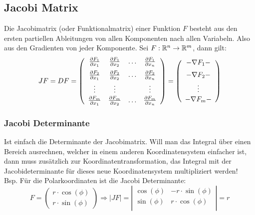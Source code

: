 \subsection{Jacobi Matrix}
Die Jacobimatrix (oder Funktionalmatrix) einer Funktion $F$ besteht aus den ersten partiellen Ableitungen von allen Komponenten nach allen Variabeln. Also aus den Gradienten von jeder Komponente. Sei $F: \mathbb{R}^n \to \mathbb{R}^m$, dann gilt:
\begin{align*}
	JF = DF =
	\left(\begin{array}{cccc}
		\vspace{0.2cm}\frac{\partial F_1}{\partial x_1} & \frac{\partial F_1}{\partial x_2} & \ldots & \frac{\partial F_1}{\partial x_n}\\
		\vspace{0.1cm}\frac{\partial F_2}{\partial x_1} & \frac{\partial F_2}{\partial x_2} & \ldots & \frac{\partial F_2}{\partial x_n}\\
		\vspace{0.05cm}\vdots & \vdots & & \vdots\\
		\frac{\partial F_m}{\partial x_1} & \frac{\partial F_m}{\partial x_2} & \ldots & \frac{\partial F_m}{\partial x_n}
	\end{array}\right)
	=
	\left(\begin{array}{c}
		\vspace{0.2cm} - \nabla F_1 -\\
		\vspace{0.1cm} - \nabla F_2 -\\
		\vspace{0.05cm}\vdots\\
		- \nabla F_m -
	\end{array}\right)
\end{align*}

\subsubsection{Jacobi Determinante}
Ist einfach die Determinante der Jacobimatrix. Will man das Integral über einen Bereich ausrechnen, welcher in einem anderen Koordinatensystem einfacher ist, dann muss zusätzlich zur Koordinatentransformation, das Integral mit der Jacobideterminante für dieses neue Koordinatensystem multipliziert werden!\\
Bsp. Für die Polarkoordinaten ist die Jacobi Determinante:
\[
	F = 
	\left(\begin{array}{c}
		r \cdot \cos(\phi) \\
		r \cdot \sin(\phi)
	\end{array}\right)
	\Rightarrow
	|JF| = 
	\left|\begin{array}{cc}
		\cos(\phi) & -r \cdot \sin(\phi)\\
		\sin(\phi) & r \cdot \cos(\phi)\\
	\end{array}\right|
	= r
\]
